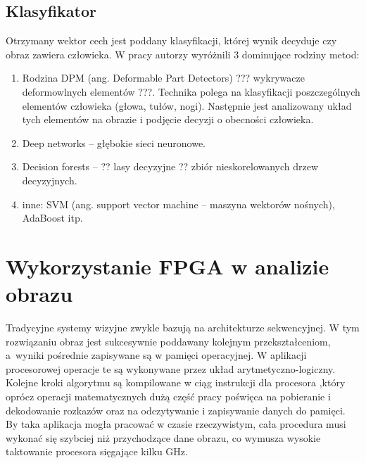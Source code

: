 \subsection{Klasyfikator}
Otrzymany wektor cech jest poddany klasyfikacji, której wynik decyduje czy obraz zawiera człowieka.
W pracy \cite{benenson2014ten} autorzy wyróżnili 3 dominujące rodziny metod:

\begin{enumerate}
\item Rodzina DPM (ang. Deformable Part Detectors) ??? wykrywacze deformowlnych elementów ???. %
Technika polega na klasyfikacji poszczególnych elementów człowieka (głowa, tułów, nogi). Następnie jest analizowany układ tych elementów na obrazie i podjęcie decyzji o obecności człowieka.

\item Deep networks – głębokie sieci neuronowe.

\item Decision forests – ?? lasy decyzyjne ?? zbiór nieskorelowanych drzew decyzyjnych.

\item inne: SVM (ang. support vector machine – maszyna wektorów nośnych), AdaBoost itp.



\end{enumerate}







\section{Wykorzystanie FPGA w analizie obrazu}

Tradycyjne systemy wizyjne zwykle bazują na architekturze sekwencyjnej.
W tym rozwiązaniu obraz jest sukcesywnie poddawany kolejnym przekształceniom, a~wyniki pośrednie zapisywane są w pamięci operacyjnej. 
W aplikacji procesorowej operacje te są wykonywane przez układ arytmetyczno-logiczny. 
Kolejne kroki algorytmu są kompilowane w ciąg instrukcji dla procesora ,który oprócz operacji matematycznych dużą część pracy poświęca na pobieranie i dekodowanie rozkazów oraz na odczytywanie i zapisywanie danych do pamięci. 
By taka aplikacja mogła pracować w czasie rzeczywistym, cała procedura musi wykonać się szybciej niż przychodzące dane obrazu, co wymusza wysokie taktowanie procesora sięgające kilku GHz. 

